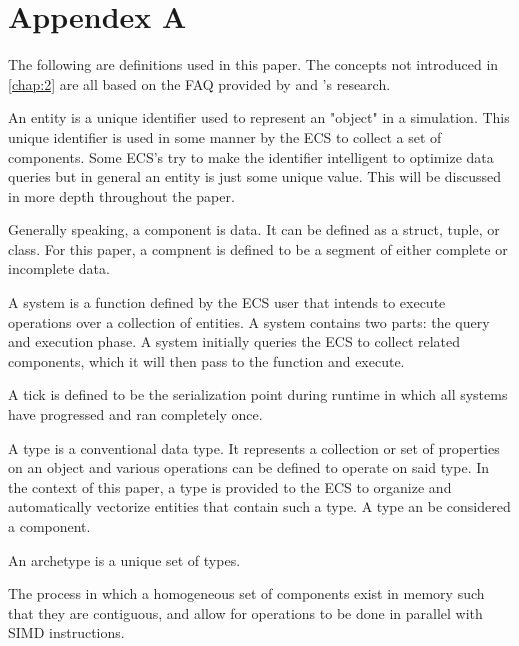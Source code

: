 \section{Appendex A}
\label{appendix:a}

The following are definitions used in this paper. The concepts not introduced in \ref{chap:2} are all based on the FAQ provided by \cite{SanderMertensFAQ} and \cite{RomeoPHD}'s research.
\begin{description}[font=\sffamily\bfseries, leftmargin=1cm, style=nextline]
    \item[Entity]
        An entity is a unique identifier used to represent an "object" in a simulation. This unique identifier is used in some manner by the ECS to collect a set of components. Some ECS's try to make the identifier intelligent to optimize data queries but in general an entity is just some unique value. This will be discussed in more depth throughout the paper.
    \item[Component]
        Generally speaking, a component is data. It can be defined as a struct, tuple, or class. For this paper, a compnent is defined to be a segment of either complete or incomplete data.
    \item[System]
        A system is a function defined by the ECS user that intends to execute operations over a collection of entities. A system contains two parts: the query and execution phase. A system initially queries the ECS to collect related components, which it will then pass to the function and execute.
    \item[Tick]
        A tick is defined to be the serialization point during runtime in which all systems have progressed and ran completely once.
    \item[Type]
        A type is a conventional data type. It represents a collection or set of properties on an object and various operations can be defined to operate on said type. In the context of this paper, a type is provided to the ECS to organize and automatically vectorize entities that contain such a type. A type an be considered a component.
    \item[Archetype] 
        An archetype is a unique set of types.
    \item[Vectorization]
        The process in which a homogeneous set of components exist in memory such that they are contiguous, and allow for operations to be done in parallel with SIMD instructions.
  \end{description}


